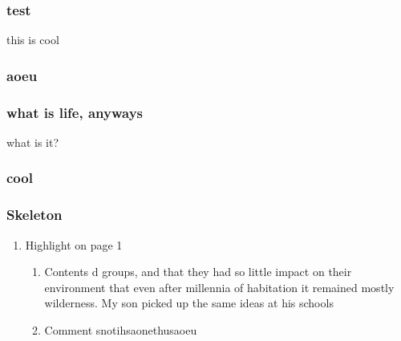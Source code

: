\documentclass[letterpaper]{article}
\begin{document}
\subsubsection{test}
\label{sec:org15c0a5e}
this is cool
\subsubsection{aoeu}
\label{sec:org60e4ab0}
\subsubsection{what is life, anyways}
\label{sec:org81bb671}
what is it?
\subsubsection{cool}
\label{sec:org2bbd447}

\subsubsection{Skeleton}
\label{sec:org678c816}
\begin{enumerate}
\item Highlight on page 1
\label{sec:orgabc07e4}
\begin{enumerate}
\item Contents
\label{sec:org5cb54df}
d groups, and that they had so little impact on their environment that even
after millennia of habitation it remained mostly wilderness. My son picked up the
same ideas at his schools
\item Comment
\label{sec:org2d5c805}
snotihsaonethusaoeu
\end{enumerate}
\end{enumerate}
\end{document}
